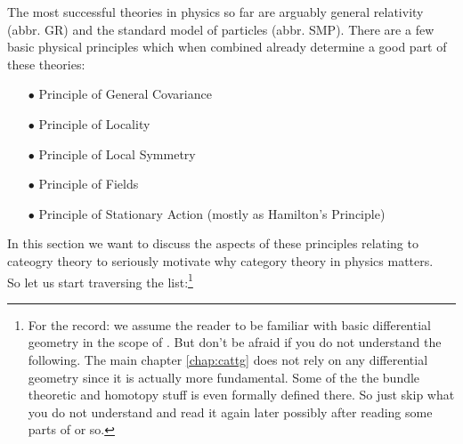 The most successful theories in physics so far are arguably general relativity (abbr. GR) and the standard model of particles (abbr. SMP). There are a few basic physical principles which when combined already determine a good part of these theories:
\begin{enumerate}
\item[$\bullet$]
Principle of General Covariance
\item[$\bullet$]
Principle of Locality
\item[$\bullet$]
Principle of Local Symmetry
\item[$\bullet$]
Principle of Fields
\item[$\bullet$]
Principle of Stationary Action (mostly as Hamilton's Principle)
\end{enumerate}
In this section we want to discuss the aspects of these principles relating to cateogry theory to seriously motivate why category theory in physics matters.
\\
So let us start traversing the list:\footnote{For the record: we assume the reader to be familiar with basic differential geometry in the scope of \cite{797789bc}. But don't be afraid if you do not understand the following. The main chapter \ref{chap:cattg} does not rely on any differential geometry since it is actually more fundamental. Some of the the bundle theoretic and homotopy stuff is even formally defined there. So just skip what you do not understand and read it again later possibly after reading some parts of \cite{797789bc} or so.}
